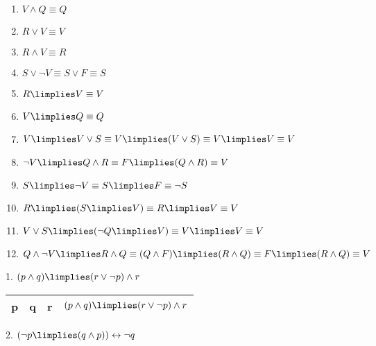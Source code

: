 \documentclass{article}
\begin{document}
\begin{enumerate}
    \item $V \land Q \equiv Q$
    \item $R \lor V \equiv V$
    \item $R \land V \equiv R$
    \item $S \lor \lnot V \equiv S \lor F \equiv S$
    \item $R \limplies V \equiv V$
    \item $V \limplies Q \equiv Q$
    \item $V \limplies V \lor S \equiv V \limplies (V \lor S) \equiv V \limplies V \equiv V$
    \item $\lnot V \limplies Q \land R \equiv F \limplies (Q \land R) \equiv V$
    \item $S \limplies \lnot V \equiv S \limplies F \equiv \lnot S$
    \item $R \limplies (S \limplies V) \equiv R \limplies V \equiv V$
    \item $V \lor S \limplies (\lnot Q \limplies V) \equiv V \limplies V \equiv V$
    \item $Q \land \lnot V \limplies R \land Q \equiv (Q \land F) \limplies (R \land Q) \equiv F \limplies (R \land Q) \equiv V$
\end{enumerate}


1. $(p \land q) \limplies (r \lor \lnot p) \land r$

\begin{center}
    \begin{tabular}{| c | c | c | c |}
        \hline
        p & q & r & $(p \land q) \limplies (r \lor \lnot p) \land r$ \\
        \hline
    \end{tabular}
\end{center}

2. $(\lnot p \limplies (q \land p)) \leftrightarrow \lnot q$
\end{document}
